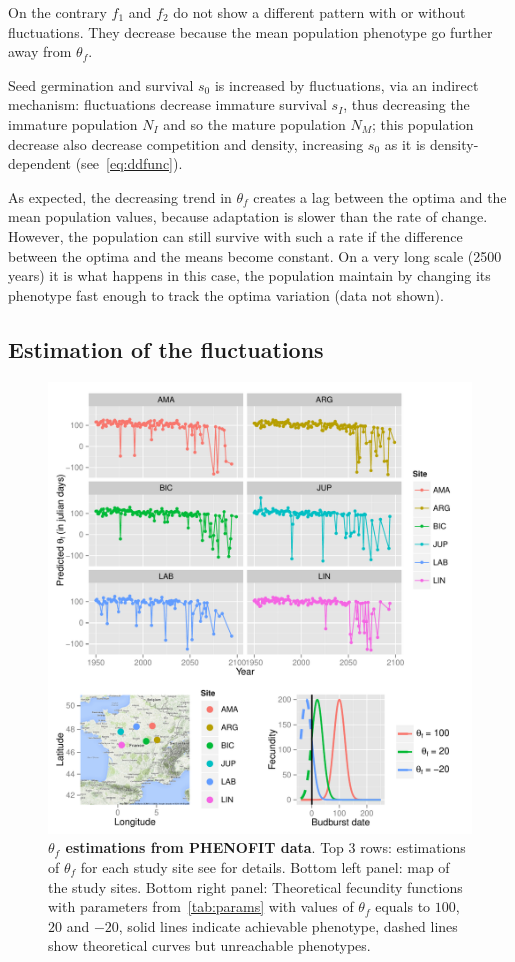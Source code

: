 On the contrary $f_1$ and $f_2$ do not show a different pattern with or without fluctuations. They decrease because the mean population phenotype go further away from $\theta_f$.

Seed germination and survival $s_0$ is increased by fluctuations, via an indirect mechanism: fluctuations decrease immature survival $s_I$, thus decreasing the immature population $N_I$ and so the mature population $N_M$; this population decrease also decrease competition and density, increasing $s_0$ as it is density-dependent (see~\autoref{eq:ddfunc}).

As expected, the decreasing trend in $\theta_f$ creates a lag between the optima and the mean population values, because adaptation is slower than the rate of change. However, the population can still survive with such a rate if the difference between the optima and the means become constant. On a very long scale (2500 years) it is what happens in this case, the population maintain by changing its phenotype fast enough to track the optima variation (data not shown).

\subsection*{Estimation of the fluctuations}

\begin{figure}[ht!]
	\centering
	\includegraphics[scale=1]{Figures/optsmaps.pdf}
	\caption{\textbf{$\theta_{f}$ estimations from PHENOFIT data}. Top 3 rows: estimations of $\theta_f$ for each study site see  for details. Bottom left panel: map of the study sites. Bottom right panel: Theoretical fecundity functions with parameters from~\autoref{tab:params} with values of $\theta_f$ equals to $100$, $20$ and $-20$, solid lines indicate achievable phenotype, dashed lines show theoretical curves but unreachable phenotypes.}
	\label{fig:thetaf}
\end{figure}

